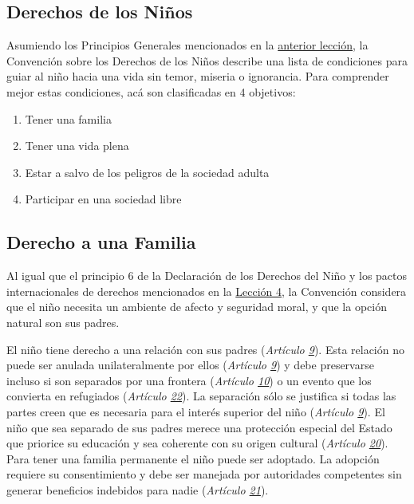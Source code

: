 \documentclass{tufte-handout}
\begin{document}
\subsection{Derechos de los Niños}\label{subsec:derechos}

Asumiendo los Principios Generales mencionados en la \hyperref[subsec:conceptos]{anterior lección}, la Convención sobre los Derechos de los Niños describe una lista de condiciones para guiar al niño hacia una vida sin temor, miseria o ignorancia. Para comprender mejor estas condiciones, acá son clasificadas en 4 objetivos:

\begin{enumerate}
\item{Tener una familia}
\item{Tener una vida plena}
\item{Estar a salvo de los peligros de la sociedad adulta}
\item{Participar en una sociedad libre}
\end{enumerate}

\subsection{Derecho a una Familia}\label{subsec:familia}


Al igual que el principio 6 de la Declaración de los Derechos del Niño y los pactos internacionales de derechos mencionados en la \hyperref[subsec:efecto]{Lección 4}, la Convención considera que el niño necesita un ambiente de afecto y seguridad moral, y que la opción natural son sus padres. 

El niño tiene derecho a una relación con sus padres (\textit{Artículo \href{https://procosi.github.io/nenes/convencion/?a=9}{9}}). Esta relación no puede ser anulada unilateralmente por ellos (\textit{Artículo \href{https://procosi.github.io/nenes/convencion/?a=9}{9}}) y debe preservarse incluso si son separados por una frontera (\textit{Artículo \href{https://procosi.github.io/nenes/convencion/?a=10}{10}}) o un evento que los convierta en refugiados (\textit{Artículo \href{https://procosi.github.io/nenes/convencion/?a=22}{22}}). La separación sólo se justifica si todas las partes creen que es necesaria para el interés superior del niño (\textit{Artículo \href{https://procosi.github.io/nenes/convencion/?a=9}{9}}). El niño que sea separado de sus padres merece una protección especial del Estado que priorice su educación y sea coherente con su origen cultural (\textit{Artículo \href{https://procosi.github.io/nenes/convencion/?a=}{20}}). Para tener una familia permanente el niño puede ser adoptado. La adopción requiere su consentimiento y debe ser manejada por autoridades competentes sin generar beneficios indebidos para nadie (\textit{Artículo \href{https://procosi.github.io/nenes/convencion/?a=21}{21}}).
\end{document}
